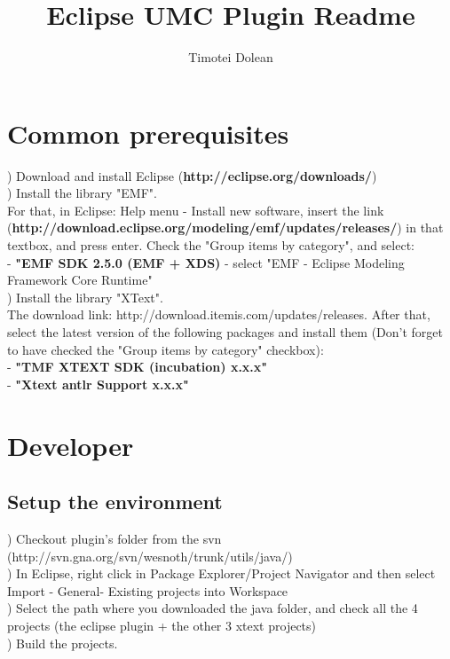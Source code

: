 \documentclass[10pt]{article}
\title{Eclipse UMC Plugin Readme}
\author{Timotei Dolean}
\begin{document}
\maketitle

\newcommand{\icnt}{  \thecnt }

\section{Common prerequisites}
\icnt) Download and install Eclipse ({\bf http://eclipse.org/downloads/}) \\
\icnt) Install the library "EMF". \\ 
For that, in Eclipse: Help menu -  Install new software, insert the link \\
({\bf http://download.eclipse.org/modeling/emf/updates/releases/}) in that textbox, and press enter. 
Check the "Group items by category", and select: \\ 
    - {\bf "EMF SDK 2.5.0 (EMF + XDS)} - select "EMF - Eclipse Modeling Framework Core Runtime"\\
\icnt) Install the library "XText". \\
The download link: http://download.itemis.com/updates/releases. 
After that, select the latest version of the following packages and 
install them (Don't forget to have checked the "Group items by category" checkbox): \\
    - {\bf "TMF XTEXT SDK (incubation) x.x.x"} \\
    - {\bf "Xtext antlr Support x.x.x"} \\

\section{Developer}
\subsection{Setup the environment}
\setcounter{cnt}{0}
\icnt) Checkout plugin's folder from the svn (http://svn.gna.org/svn/wesnoth/trunk/utils/java/) \\
\icnt) In Eclipse, right click in Package Explorer/Project Navigator and then select 
Import - General- Existing projects into Workspace \\
\icnt) Select the path where you downloaded the java folder, and check all the 4 projects 
(the eclipse plugin + the other 3 xtext projects) \\
\icnt) Build the projects. 
\end{document}
